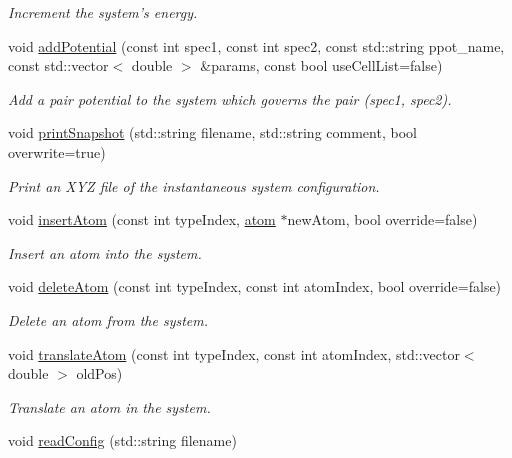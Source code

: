 \begin{DoxyCompactItemize}
\begin{DoxyCompactList}\small\item\em Increment the system's energy. \end{DoxyCompactList}\item 
void \hyperlink{classsim_system_a43ae18ca5e66c8e916b88b71c5ee5240}{add\-Potential} (const int spec1, const int spec2, const std\-::string ppot\-\_\-name, const std\-::vector$<$ double $>$ \&params, const bool use\-Cell\-List=false)
\begin{DoxyCompactList}\small\item\em Add a pair potential to the system which governs the pair (spec1, spec2). \end{DoxyCompactList}\item 
void \hyperlink{classsim_system_ae3096dc65acdf38cc824e507cca33370}{print\-Snapshot} (std\-::string filename, std\-::string comment, bool overwrite=true)
\begin{DoxyCompactList}\small\item\em Print an X\-Y\-Z file of the instantaneous system configuration. \end{DoxyCompactList}\item 
void \hyperlink{classsim_system_a0404e9435cc046d19b6bb990678ee069}{insert\-Atom} (const int type\-Index, \hyperlink{classatom}{atom} $\ast$new\-Atom, bool override=false)
\begin{DoxyCompactList}\small\item\em Insert an atom into the system. \end{DoxyCompactList}\item 
void \hyperlink{classsim_system_acabf4fc5b5b90bba62e1449ddb3646c6}{delete\-Atom} (const int type\-Index, const int atom\-Index, bool override=false)
\begin{DoxyCompactList}\small\item\em Delete an atom from the system. \end{DoxyCompactList}\item 
void \hyperlink{classsim_system_a22fdaceea44abd6cd021bac1ecd11890}{translate\-Atom} (const int type\-Index, const int atom\-Index, std\-::vector$<$ double $>$ old\-Pos)
\begin{DoxyCompactList}\small\item\em Translate an atom in the system. \end{DoxyCompactList}\item 
void \hyperlink{classsim_system_a3161d95bbb800d5d95a732ac5fc32b95}{read\-Config} (std\-::string filename)

\end{DoxyCompactItemize}
